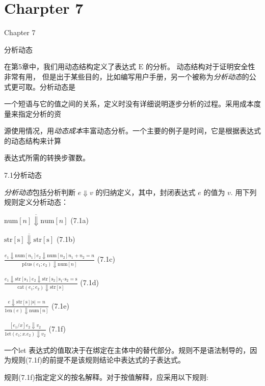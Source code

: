 \section{Charpter 7}

Chapter 7

分析动态

在第5章中，我们用动态结构定义了表达式 $\mathrm{E}$ 的分析。 动态结构对于证明安全性非常有用，
但是出于某些目的，比如编写用户手册，另一个被称为{\it 分析动态}的公式更可取。分析动态是

一个短语与它的值之间的关系，定义时没有详细说明逐步分析的过程。采用成本度量来指定分析的资

源使用情况，用{\it 动态成本}丰富动态分析。一个主要的例子是时间，它是根据表达式的动态结构来计算

表达式所需的转换步骤数。

7.1分析动态

{\it 分析动态}包括分析判断 $e\Downarrow v$ 的归纳定义，其中，封闭表达式 $e$ 的值为 $v$. 用下列规则定义分析动态：
\begin{center}
$\overline{\mathrm{n}\mathrm{u}\mathrm{m}[n]\Downarrow \mathrm{n}\mathrm{u}\mathrm{m}[n]}$   (7.1a)

$\overline{\mathrm{s}\mathrm{t}\mathrm{r}[\mathrm{s}]\Downarrow \mathrm{s}\mathrm{t}\mathrm{r}[\mathrm{s}]}$   (7.1b)

$\displaystyle \frac{e_{1}\Downarrow \mathrm{n}\mathrm{u}\mathrm{m}[n_{1}]e_{2}\Downarrow \mathrm{n}\mathrm{u}\mathrm{m}[n_{2}]n_{1}+n_{2}=n}{\mathrm{p}1\mathrm{u}\mathrm{s}(e_{1};e_{2})\Downarrow \mathrm{n}\mathrm{u}\mathrm{m}[n]}$   (7.1c)

$\displaystyle \frac{e_{1}\Downarrow \mathrm{s}\mathrm{t}\mathrm{r}[\mathrm{s}_{1}]e_{2}\Downarrow \mathrm{s}\mathrm{t}\mathrm{r}[\mathrm{s}_{2}]\mathrm{s}_{1^{\wedge}}\mathrm{s}_{2}=\mathrm{s}}{\mathrm{c}\mathrm{a}\mathrm{t}(e_{1};e_{2})\Downarrow \mathrm{s}\mathrm{t}\mathrm{r}[\mathrm{s}]}$   (7.1d)

$\displaystyle \frac{e\Downarrow \mathrm{s}\mathrm{t}\mathrm{r}[\mathrm{s}]|\mathrm{s}|=n}{1\mathrm{e}\mathrm{n}(e)\Downarrow \mathrm{n}\mathrm{u}\mathrm{m}[n]}$   (7.1e)

$\displaystyle \frac{[e_{1}/x]e_{2}\Downarrow v_{2}}{1\mathrm{e}\mathrm{t}(e_{1};x.e_{2})\Downarrow v_{2}}$   (7.1f)
\end{center}
一个let 表达式的值取决于在绑定在主体中的替代部分。规则不是语法制导的，因为规则(7.1f)的前提不是该规则结论中表达式的子表达式。

规则(7.1f)指定定义的按名解释。对于按值解释，应采用以下规则:

